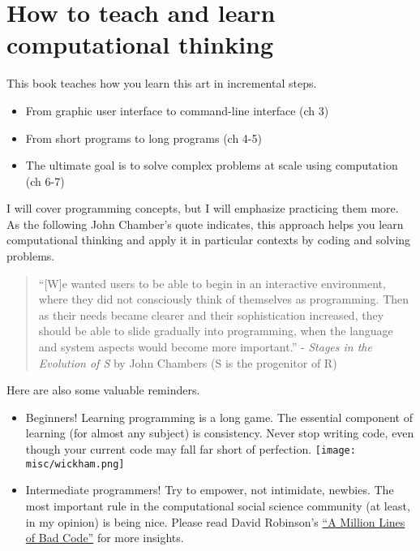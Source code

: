 \documentclass[
]{book}
\begin{document}
\hypertarget{how-to-teach-and-learn-computational-thinking}{%
\section{How to teach and learn computational thinking}\label{how-to-teach-and-learn-computational-thinking}}

This book teaches how you learn this art in incremental steps.

\begin{itemize}
\item
  From graphic user interface to command-line interface (ch 3)
\item
  From short programs to long programs (ch 4-5)
\item
  The ultimate goal is to solve complex problems at scale using computation (ch 6-7)
\end{itemize}

I will cover programming concepts, but I will emphasize practicing them more. As the following John Chamber's quote indicates, this approach helps you learn computational thinking and apply it in particular contexts by coding and solving problems.

\begin{quote}
``{[}W{]}e wanted users to be able to begin in an interactive environment, where they did not consciously think of themselves as programming. Then as their needs became clearer and their sophistication increased, they should be able to slide gradually into programming, when the language and system aspects would become more important.'' - \emph{Stages in the Evolution of S} by John Chambers (S is the progenitor of R)
\end{quote}

Here are also some valuable reminders.

\begin{itemize}
\item
  Beginners! Learning programming is a long game. The essential component of learning (for almost any subject) is consistency. Never stop writing code, even though your current code may fall far short of perfection.
  \texttt{[image: misc/wickham.png]}
\item
  Intermediate programmers! Try to empower, not intimidate, newbies. The most important rule in the computational social science community (at least, in my opinion) is being nice. Please read David Robinson's \href{http://varianceexplained.org/programming/bad-code/}{``A Million Lines of Bad Code''} for more insights.
\end{itemize}
\end{document}

